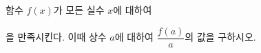 함수 $f(x)$가 모든 실수 $x$에 대하여\par\smallskip{}\par\smallskip\noindent 을 만족시킨다. 이때 상수 $a$에 대하여 $\dfrac{f(a)}{a}$의 값을 구하시오. 
